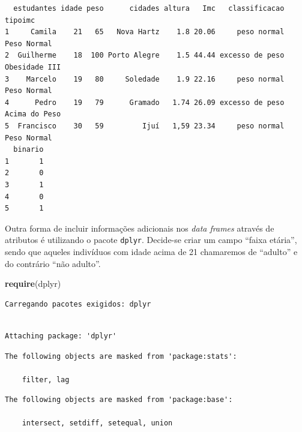 \documentclass[12pt,brazil,oneside]{book}
\newenvironment{Shaded}{\begin{snugshade}}{\end{snugshade}}
\newcommand{\DecValTok}[1]{\textcolor[rgb]{0.00,0.00,0.81}{#1}}
\newcommand{\KeywordTok}[1]{\textcolor[rgb]{0.13,0.29,0.53}{\textbf{#1}}}
\newcommand{\NormalTok}[1]{#1}
\newcommand{\OperatorTok}[1]{\textcolor[rgb]{0.81,0.36,0.00}{\textbf{#1}}}
\newcommand{\StringTok}[1]{\textcolor[rgb]{0.31,0.60,0.02}{#1}}
\begin{document}
\begin{verbatim}
  estudantes idade peso      cidades altura   Imc   classificacao       tipoimc
1     Camila    21   65   Nova Hartz    1.8 20.06     peso normal   Peso Normal
2  Guilherme    18  100 Porto Alegre    1.5 44.44 excesso de peso Obesidade III
3    Marcelo    19   80     Soledade    1.9 22.16     peso normal   Peso Normal
4      Pedro    19   79      Gramado   1.74 26.09 excesso de peso Acima do Peso
5  Francisco    30   59         Ijuí   1,59 23.34     peso normal   Peso Normal
  binario
1       1
2       0
3       1
4       0
5       1
\end{verbatim}

Outra forma de incluir informações adicionais nos \emph{data frames} através de atributos é utilizando o pacote \texttt{dplyr}. Decide-se criar um campo ``faixa etária'', sendo que aqueles indivíduos com idade acima de 21 chamaremos de ``adulto'' e do contrário ``não adulto''.

\begin{Shaded}
\begin{Highlighting}[]
\KeywordTok{require}\NormalTok{(dplyr)}
\end{Highlighting}
\end{Shaded}

\begin{verbatim}
Carregando pacotes exigidos: dplyr
\end{verbatim}

\begin{verbatim}

Attaching package: 'dplyr'
\end{verbatim}

\begin{verbatim}
The following objects are masked from 'package:stats':

    filter, lag
\end{verbatim}

\begin{verbatim}
The following objects are masked from 'package:base':

    intersect, setdiff, setequal, union
\end{verbatim}

\begin{Shaded}
\end{Shaded}
\end{document}
